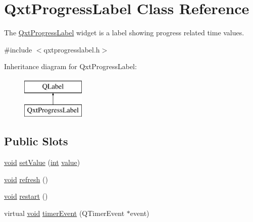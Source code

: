 \hypertarget{class_qxt_progress_label}{\section{Qxt\-Progress\-Label Class Reference}
\label{class_qxt_progress_label}
}


The \hyperlink{class_qxt_progress_label}{Qxt\-Progress\-Label} widget is a label showing progress related time values.  




{\ttfamily \#include $<$qxtprogresslabel.\-h$>$}

Inheritance diagram for Qxt\-Progress\-Label\-:\begin{figure}[H]
\begin{center}
\leavevmode
\includegraphics[height=2.000000cm]{class_qxt_progress_label}
\end{center}
\end{figure}
\subsection*{Public Slots}
\begin{DoxyCompactItemize}
\item 
\hyperlink{group___u_a_v_objects_plugin_ga444cf2ff3f0ecbe028adce838d373f5c}{void} \hyperlink{class_qxt_progress_label_a8d96e47266a92c24eddef75ca8646705}{set\-Value} (\hyperlink{ioapi_8h_a787fa3cf048117ba7123753c1e74fcd6}{int} \hyperlink{glext_8h_aa0e2e9cea7f208d28acda0480144beb0}{value})
\item 
\hyperlink{group___u_a_v_objects_plugin_ga444cf2ff3f0ecbe028adce838d373f5c}{void} \hyperlink{class_qxt_progress_label_a36a9733ae436adf2deb008e58c222e9a}{refresh} ()
\item 
\hyperlink{group___u_a_v_objects_plugin_ga444cf2ff3f0ecbe028adce838d373f5c}{void} \hyperlink{class_qxt_progress_label_af982958423b15ed99ba2c32fa6d51973}{restart} ()
\item 
virtual \hyperlink{group___u_a_v_objects_plugin_ga444cf2ff3f0ecbe028adce838d373f5c}{void} \hyperlink{class_qxt_progress_label_ac8fef035e8aab48551c0b2c21802082f}{timer\-Event} (Q\-Timer\-Event $\ast$event)
\end{DoxyCompactItemize}


